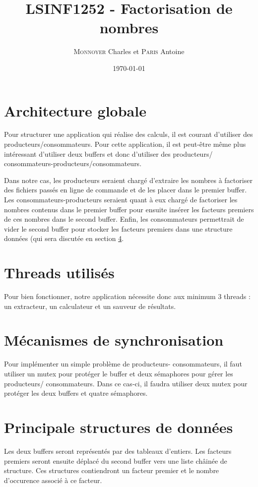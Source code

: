 \documentclass{scrartcl}
\title{LSINF1252 - Factorisation de nombres}
\author{\textsc{Monnoyer} Charles et \textsc{Paris} Antoine}
\date{\today}
\begin{document}
\maketitle

\section{Architecture globale}
Pour structurer une application qui réalise des calculs,
il est courant d'utiliser des producteurs/consommateurs\cite{syll}.
Pour cette application, il est peut-être même plus intéressant
d'utiliser deux buffers et donc d'utiliser des producteurs/
consommateurs-producteurs/consommateurs.

Dans notre cas, les producteurs seraient chargé d'extraire
les nombres à factoriser des fichiers passés en ligne
de commande et de les placer dans le premier buffer. Les
consommateurs-producteurs seraient quant à eux chargé de
factoriser les nombres contenus dans le premier buffer pour
ensuite insérer les facteurs premiers de ces nombres
dans le second buffer. Enfin, les consommateurs
permettrait de vider le second buffer pour stocker les
facteurs premiers dans une structure données (qui sera
discutée en section \ref{sec:data-structure}.

\section{Threads utilisés}
Pour bien fonctionner, notre application nécessite donc
aux minimum 3 threads : un extracteur, un calculateur et
un sauveur de résultats.

\section{Mécanismes de synchronisation}
Pour implémenter un simple problème de producteurs-
consommateurs, il faut utiliser un mutex pour protéger
le buffer et deux sémaphores pour gérer les producteurs/
consommateurs. Dans ce cas-ci, il faudra utiliser deux
mutex pour protéger les deux buffers et quatre sémaphores.

\section{Principale structures de données}
\label{sec:data-structure}
Les deux buffers seront représentés par des tableaux d'entiers.
Les facteurs premiers seront ensuite déplacé du second
buffer vers une liste châinée de structure.
Ces structures contiendront un facteur premier et le
nombre d'occurence associé à ce facteur.
\end{document}
